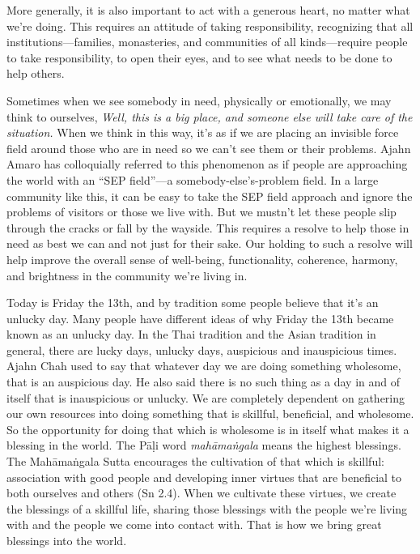 More generally, it is also important to act with a generous heart, no 
matter what we're doing. This requires an attitude of taking 
responsibility, recognizing that all institutions---families, 
monasteries, and communities of all kinds---require people to take 
responsibility, to open their eyes, and to see what needs to be done to 
help others.

Sometimes when we see somebody in need, physically or emotionally, we 
may think to ourselves, \emph{Well, this is a big place, and someone 
else will take care of the situation.} When we think in this way, it's 
as if we are placing an invisible force field around those who are in 
need so we can't see them or their problems. Ajahn Amaro has 
colloquially referred to this phenomenon as if people are approaching 
the world with an ``SEP field''---a somebody-else's-problem field. In a 
large community like this, it can be easy to take the SEP field 
approach and ignore the problems of visitors or those we live with. But 
we mustn't let these people slip through the cracks or fall by the 
wayside. This requires a resolve to help those in need as best we can 
and not just for their sake. Our holding to such a resolve will help 
improve the overall sense of well-being, functionality, coherence, 
harmony, and brightness in the community we're living in.


Today is Friday the 13th, and by tradition some people believe that 
it's an unlucky day. Many people have different ideas of why Friday the 
13th became known as an unlucky day. In the Thai tradition and the 
Asian tradition in general, there are lucky days, unlucky days, 
auspicious and inauspicious times. Ajahn Chah used to say that whatever 
day we are doing something wholesome, that is an auspicious day. He 
also said there is no such thing as a day in and of itself that is 
inauspicious or unlucky. We are completely dependent on gathering our 
own resources into doing something that is skillful, beneficial, and 
wholesome. So the opportunity for doing that which is wholesome is in 
itself what makes it a blessing in the world. The Pāḷi word 
\emph{mahāmaṅgala} means the highest blessings. The Mahāmaṅgala 
Sutta encourages the cultivation of that which is skillful: association 
with good people and developing inner virtues that are beneficial to 
both ourselves and others (Sn 2.4). When we cultivate these virtues, we 
create the blessings of a skillful life, sharing those blessings with 
the people we're living with and the people we come into contact with. 
That is how we bring great blessings into the world.

